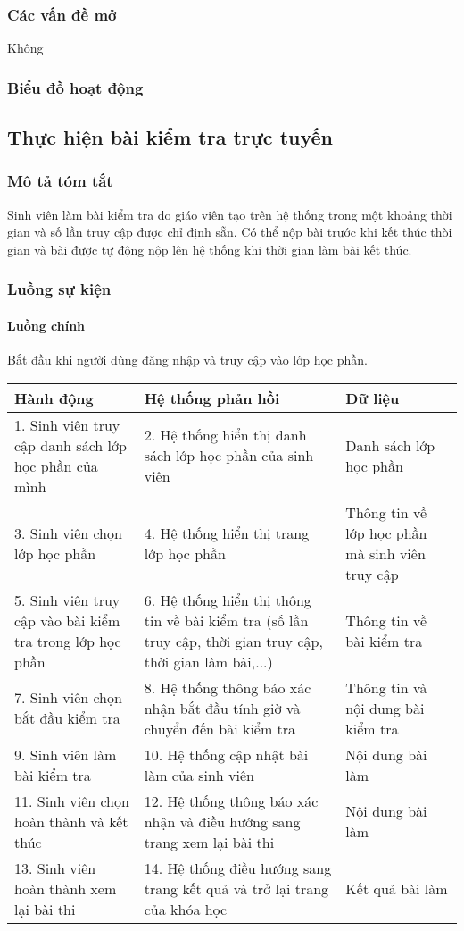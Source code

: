 \documentclass[./../main_file.tex]{subfiles}
\begin{document}
\subsubsection{Các vấn đề mở}
Không

\subsubsection{Biểu đồ hoạt động}

\subsection{Thực hiện bài kiểm tra trực tuyến}
\subsubsection{Mô tả tóm tắt}
Sinh viên làm bài kiểm tra do giáo viên tạo trên hệ thống trong một khoảng thời gian và số lần truy cập được chỉ định sẵn. Có thể nộp bài trước khi kết thúc thòi gian và bài được tự động nộp lên hệ thống khi thời gian làm bài kết thúc.

\subsubsection{Luồng sự kiện}
\paragraph{Luồng chính}
Bắt đầu khi người dùng đăng nhập và truy cập vào lớp học phần.
\begin{table}[H]
				\begin{tabular}{|p{.33\textwidth}|p{}|p{}|}
		\hline
		\textbf{Hành động} &
		\textbf{Hệ thống phản hồi} &
		\textbf{Dữ liệu} \\ \hline
		1. Sinh viên truy cập danh sách lớp học phần của mình &
		2. Hệ thống hiển thị danh sách lớp học phần của sinh viên &
		Danh sách lớp học phần \\ \hline
		3. Sinh viên chọn lớp học phần &
		4.  Hệ thống hiển thị trang lớp học phần &
		Thông tin về lớp học phần mà sinh viên truy cập \\ \hline
		5. Sinh viên truy cập vào bài kiểm tra trong lớp học phần &
		6. Hệ thống hiển thị thông tin về bài kiểm tra (số lần truy cập, thời gian truy cập, thời gian làm bài,...) &
		Thông tin về bài kiểm tra \\ \hline
		7. Sinh viên chọn bắt đầu kiểm tra &
		8. Hệ thống thông báo xác nhận bắt đầu tính giờ và chuyển đến bài kiểm tra &
		Thông tin và nội dung bài kiểm tra \\ \hline
		9. Sinh viên làm bài kiểm tra &
		10. Hệ thống cập nhật bài làm của sinh viên &
		Nội dung bài làm \\ \hline
		11. Sinh viên chọn hoàn thành và kết thúc &
		12. Hệ thống thông báo xác nhận và điều hướng sang trang xem lại bài thi &
		Nội dung bài làm \\ \hline
		13. Sinh viên hoàn thành xem lại bài thi &
		14. Hệ thống điều hướng sang trang kết quả và trở lại trang của khóa học &
		Kết quả bài làm \\ \hline
	\end{tabular}
\end{table}
\end{document}
